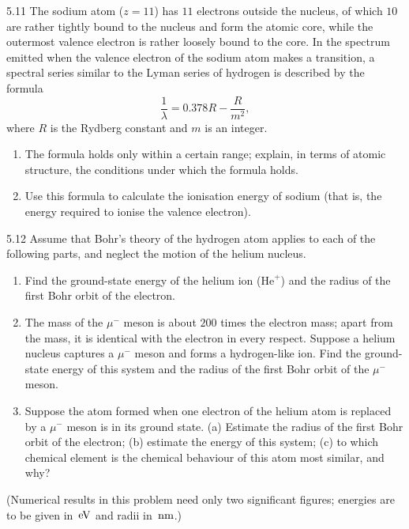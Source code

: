 \begin{problem}{5.11}
The sodium atom ($z = 11$) has $11$ electrons outside the nucleus, of which $10$ are rather tightly bound to the nucleus and form the atomic core, while the outermost valence electron is rather loosely bound to the core. In the spectrum emitted when the valence electron of the sodium atom makes a transition, a spectral series similar to the Lyman series of hydrogen is described by the formula
\[
\frac{1}{\lambda} = 0.378R - \frac{R}{m^2},
\]
where $R$ is the Rydberg constant and $m$ is an integer.
\begin{enumerate}[label=(\arabic*),leftmargin=2.2em,itemsep=1pt,topsep=2pt]
\item The formula holds only within a certain range; explain, in terms of atomic structure, the conditions under which the formula holds.
\item Use this formula to calculate the ionisation energy of sodium (that is, the energy required to ionise the valence electron).
\end{enumerate}
\end{problem}

\begin{problem}{5.12}
Assume that Bohr's theory of the hydrogen atom applies to each of the following parts, and neglect the motion of the helium nucleus.
\begin{enumerate}[label=(\arabic*),leftmargin=2.2em,itemsep=1pt,topsep=2pt]
\item Find the ground-state energy of the helium ion ($\mathrm{He}^+$) and the radius of the first Bohr orbit of the electron.
\item The mass of the $\mu^-$ meson is about $200$ times the electron mass; apart from the mass, it is identical with the electron in every respect. Suppose a helium nucleus captures a $\mu^-$ meson and forms a hydrogen-like ion. Find the ground-state energy of this system and the radius of the first Bohr orbit of the $\mu^-$ meson.
\item Suppose the atom formed when one electron of the helium atom is replaced by a $\mu^-$ meson is in its ground state. (a) Estimate the radius of the first Bohr orbit of the electron; (b) estimate the energy of this system; (c) to which chemical element is the chemical behaviour of this atom most similar, and why?
\end{enumerate}
(Numerical results in this problem need only two significant figures; energies are to be given in $\,\mathrm{eV}$ and radii in $\,\mathrm{nm}$.)
\end{problem}

